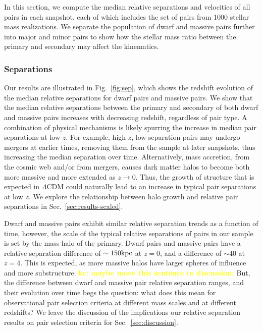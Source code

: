 \documentclass[twocolumn]{aastex631}
\newcommand{\kc}[1]{\textcolor{yellow}{\textbf{kc: #1}} }
\begin{document}
    In this section, we compute the median relative separations and velocities of all pairs in each snapshot, each of which includes the set of pairs from 1000 stellar mass realizations.
    We separate the population of dwarf and massive pairs further into major and minor pairs to show how the stellar mass ratio between the primary and secondary may affect the kinematics. 
    
        \subsubsection{Separations}
        Our results are 
        illustrated in Fig.~\ref{fig:sep}, which shows the redshift evolution of the median relative separations for dwarf pairs and massive pairs. 
        We show that the median relative separations between the primary and secondary of both dwarf and massive pairs increases with decreasing redshift, regardless of pair type. 
        A combination of physical mechanisms is likely spurring the increase in median pair separations at low $z$. 
        For example, high $z$, low separation pairs may undergo mergers at earlier times, removing them from the sample at later snapshots, thus increasing the median separation over time. 
        Alternatively, mass accretion, from the cosmic web and/or from mergers, causes dark matter halos to become both more massive and more extended as $z\to0$. 
        Thus, the growth of structure that is expected in $\Lambda$CDM could naturally lead to an increase in typical pair separations at low $z$.
        We explore the relationship between halo growth and relative pair separations in Sec.~\ref{sec:results-scaled}.
        
        Dwarf and massive pairs exhibit similar relative separation trends as a function of time, however, the scale of the typical relative separations of pairs in our sample is set by the mass halo of the primary.
        Dwarf pairs and massive pairs have a relative separation difference of $\sim150\mathrm{kpc}$ at $z=0$, and a difference of $\sim40$ at $z=4$.   
        This is expected, as more massive halos have larger spheres of influence and more substructure. 
        \kc{maybe move this sentence to discussion:}But, the difference between dwarf and massive pair relative separation ranges, and their evolution over time begs the question: what does this mean for observational pair selection criteria at different mass scales and at different redshifts? 
        We leave the discussion of the implications our relative separation results on pair selection criteria for Sec.~\ref{sec:discussion}. 
        
\end{document}
